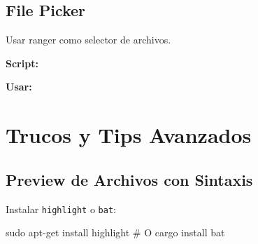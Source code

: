 \documentclass[
  doc,
  floatsintext,
  longtable,
  a4paper,
  nolmodern,
  notxfonts,
  notimes,
  12pt,
  colorlinks=true,linkcolor=blue,citecolor=blue,urlcolor=blue]{apa7}
\newenvironment{Shaded}{\begin{snugshade}}{\end{snugshade}}
\newcommand{\AttributeTok}[1]{\textcolor[rgb]{0.40,0.45,0.13}{#1}}
\newcommand{\BuiltInTok}[1]{\textcolor[rgb]{0.00,0.23,0.31}{#1}}
\newcommand{\CommentTok}[1]{\textcolor[rgb]{0.37,0.37,0.37}{#1}}
\newcommand{\ControlFlowTok}[1]{\textcolor[rgb]{0.00,0.23,0.31}{\textbf{#1}}}
\newcommand{\ExtensionTok}[1]{\textcolor[rgb]{0.00,0.23,0.31}{#1}}
\newcommand{\FunctionTok}[1]{\textcolor[rgb]{0.28,0.35,0.67}{#1}}
\newcommand{\KeywordTok}[1]{\textcolor[rgb]{0.00,0.23,0.31}{\textbf{#1}}}
\newcommand{\NormalTok}[1]{\textcolor[rgb]{0.00,0.23,0.31}{#1}}
\newcommand{\OperatorTok}[1]{\textcolor[rgb]{0.37,0.37,0.37}{#1}}
\newcommand{\OtherTok}[1]{\textcolor[rgb]{0.00,0.23,0.31}{#1}}
\newcommand{\StringTok}[1]{\textcolor[rgb]{0.13,0.47,0.30}{#1}}
\newcommand{\VariableTok}[1]{\textcolor[rgb]{0.07,0.07,0.07}{#1}}
\begin{document}
\subsection{File Picker}\label{file-picker}

Usar ranger como selector de archivos.

\textbf{Script:}

\begin{Shaded}
\end{Shaded}

\textbf{Usar:}

\begin{Shaded}
\end{Shaded}

\section{Trucos y Tips Avanzados}\label{trucos-y-tips-avanzados}

\subsection{Preview de Archivos con
Sintaxis}\label{preview-de-archivos-con-sintaxis}

Instalar \texttt{highlight} o \texttt{bat}:

\begin{Shaded}
\begin{Highlighting}[]
\FunctionTok{sudo}\NormalTok{ apt{-}get install highlight}
\CommentTok{\# O}
\ExtensionTok{cargo}\NormalTok{ install bat}
\end{Highlighting}
\end{Shaded}
\end{document}
